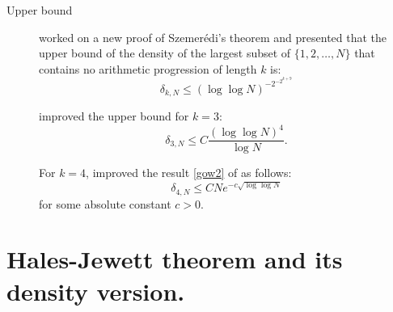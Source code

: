 \begin{description}
\item[Upper bound]
\cite{gowers2001new} worked on a new proof of Szemerédi's theorem and presented  that the upper bound of the density of the largest subset of $\{1,2, \ldots, N\}$ that contains no arithmetic progression of length $k$ is:
\begin{equation}
\delta_{k,N} \leq  \left(\log \log N\right)^{-2^{-2^{k+9}}} \label{gow2}
\end{equation}


\cite{bloom2016quantitative} improved the upper bound for $k=3:$
\begin{equation}
\delta_{3,N} \leq C \frac{(\log \log N)^4}{\log N} . \label{r32}
\end{equation}

For $k=4$, \cite{green2006new} improved the result \eqref{gow2} of \cite{gowers2001new} as follows:
\begin{equation}
\delta_{4,N} \leq C N e^{-c\sqrt{\log \log N}} \label{r4}
\end{equation}
for some absolute constant $c > 0.$
\end{description}



\section{Hales-Jewett theorem and its density version.} \label{hjt}

